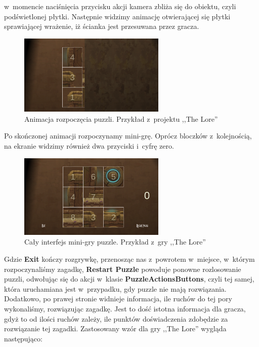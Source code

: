 \documentclass[oneside,polski,logo]{amuthesis}
\begin{document}
w~momencie naciśnięcia przycisku akcji kamera zbliża się do obiektu, czyli podświetlonej płytki. Następnie widzimy animację otwierającej się płytki sprawiającej wrażenie, iż ścianka jest przesuwana przez gracza.
\begin{figure}[h]
	\centering
	\includegraphics[width=7cm]{images/tyrek/otwieraniePuzzli.png}
	\caption{Animacja rozpoczęcia puzzli. Przykład z~projektu ,,The Lore''}
\end{figure}

Po skończonej animacji rozpoczynamy mini-grę. Oprócz bloczków z~kolejnością, na ekranie widzimy również dwa przyciski i~cyfrę zero.
\begin{figure}[h]
	\centering
	\includegraphics[width=7cm]{images/tyrek/puzzlebuttons.png}
	\caption{Cały interfejs mini-gry puzzle. Przykład z~gry ,,The Lore''}
\end{figure}

Gdzie \textbf{Exit} kończy rozgrywkę, przenosząc nas z~powrotem w~miejsce, w~którym rozpoczynaliśmy zagadkę, \textbf{Restart Puzzle} powoduje ponowne rozlosowanie puzzli, odwołując się do akcji w~klasie \textbf{PuzzleActionsButtons}, czyli tej samej, która uruchamiana jest w~przypadku, gdy puzzle nie mają rozwiązania. Dodatkowo, po prawej stronie widnieje informacja, ile ruchów do tej pory wykonaliśmy, rozwiązując zagadkę. Jest to dość istotna informacja dla gracza, gdyż to od ilości ruchów zależy, ile punktów doświadczenia zdobędzie za rozwiązanie tej zagadki. Zastosowany wzór dla gry ,,The Lore'' wygląda następująco:
\end{document}
